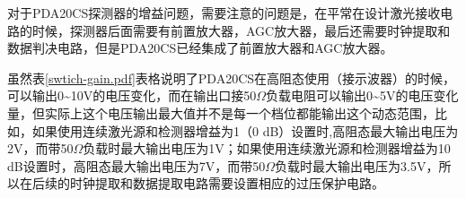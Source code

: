 对于PDA20CS探测器的增益问题，需要注意的问题是，在平常在设计激光接收电路的时候，探测器后面需要有前置放大器，AGC放大器，最后还需要时钟提取和数据判决电路，但是PDA20CS已经集成了前置放大器和AGC放大器。

虽然表\ref{swtich-gain.pdf}表格说明了PDA20CS在高阻态使用（接示波器）的时候，可以输出0\textasciitilde10V的电压变化，而在输出口接50$ \Omega $负载电阻可以输出0\textasciitilde5V的电压变化量，但实际上这个电压输出最大值并不是每一个档位都能输出这个动态范围，比如，如果使用连续激光源和检测器增益为1（0 dB）设置时,高阻态最大输出电压为2V，而带50$ \Omega $负载时最大输出电压为1V；如果使用连续激光源和检测器增益为10 dB设置时，高阻态最大输出电压为7V，而带50$ \Omega $负载时最大输出电压为3.5V，所以在后续的时钟提取和数据提取电路需要设置相应的过压保护电路。








